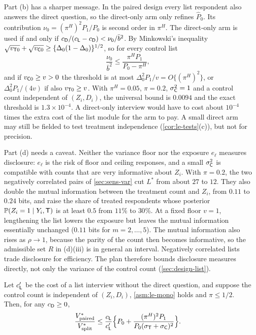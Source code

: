 Part (b) has a sharper message. In the paired design every list respondent also answers the direct question, so the direct-only arm only refines $\widehat P_0$. Its contribution $\nu_0=(\pi^H)^2P_1/P_0$ is second order in $\pi^H$. The direct-only arm is used if and only if $c_{\mathsf{D}}/(c_{\mathsf{L}}-c_{\mathsf{D}})<\nu_0/\bar b^2$. By Minkowski's inequality $\sqrt{v_{\mathsf{T}0}}+\sqrt{v_{\mathsf{C}0}}\ge\{\Delta_0(1-\Delta_0)\}^{1/2}$, so for every control list
\[
  \frac{\nu_0}{\bar b^2}\le\frac{\pi^HP_1}{P_0-\pi^H},
\]
and if $v_{\mathsf{C}0}\ge v>0$ the threshold is at most $\Delta_0^2P_1/v=O\{(\pi^H)^2\}$, or $\Delta_0^2P_1/(4v)$ if also $v_{\mathsf{T}0}\ge v$. With $\pi^H=0.05$, $\pi=0.2$, $\sigma_{\mathsf{C}}^2=1$ and a control count independent of $(Z_i,D_i)$, the universal bound is $0.0094$ and the exact threshold is $1.3\times10^{-4}$. A direct-only interview would have to cost about $10^{-4}$ times the extra cost of the list module for the arm to pay. A small direct arm may still be fielded to test treatment independence (\cref{cor:le-tests}(c)), but not for precision.

Part (d) needs a caveat. Neither the variance floor nor the exposure $e_\ell$ measures disclosure: $e_\ell$ is the risk of floor and ceiling responses, and a small $\sigma_{\mathsf{C}}^2$ is compatible with counts that are very informative about $Z_i$. With $\pi=0.2$, the two negatively correlated pairs of \cref{sec:sens-var} cut $L^*$ from about $27$ to $12$. They also double the mutual information between the treatment count and $Z_i$, from $0.11$ to $0.24$ bits, and raise the share of treated respondents whose posterior $\mathbb{P}(Z_i=1\mid Y_i,\mathsf{T})$ is at least $0.5$ from $11\%$ to $30\%$. At a fixed floor $v=1$, lengthening the list lowers the exposure but leaves the mutual information essentially unchanged ($0.11$ bits for $m=2,\dots,5$). The mutual information also rises as $\rho\to1$, because the parity of the count then becomes informative, so the admissible set $R$ in (d)(iii) is in general an interval. Negatively correlated lists trade disclosure for efficiency. The plan therefore bounds disclosure measures directly, not only the variance of the control count (\cref{sec:design-list}).

\begin{corollary}\label{cor:le-paired-split}
Let $c'_{\mathsf{L}}$ be the cost of a list interview without the direct question, and suppose the control count is independent of $(Z_i,D_i)$, \cref{asm:le-mono} holds and $\pi\le1/2$. Then, for any $c_{\mathsf{D}}\ge0$,
\[
  \frac{V^*_{\mathrm{paired}}}{V^*_{\mathrm{split}}}\le\frac{c_{\mathsf{L}}}{c'_{\mathsf{L}}}\Bigl\{P_0+\frac{(\pi^H)^2P_1}{P_0(\sigma_{\mathsf{T}}+\sigma_{\mathsf{C}})^2}\Bigr\}.
\]
\end{corollary}

